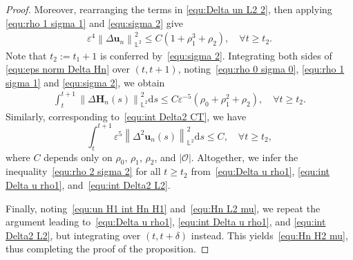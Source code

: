 \documentclass[11pt, reqno]{amsart}
\theoremstyle{definition}
\numberwithin{equation}{section}
\newcommand{\bff}{\boldsymbol}
\newcommand{\bb}{\mathbb}
\newcommand{\ds}{\mathrm{d}s}
\newcommand{\norm}[2]{\left\|{#1}\right\|_{#2}}
\newcommand{\inpro}[2]{\left\langle#1,#2\right\rangle}
\begin{document}
\begin{proof}

	
	Moreover, rearranging the terms in \eqref{equ:Delta un L2 2}, then applying \eqref{equ:rho 1 sigma 1} and \eqref{equ:sigma 2} give
	\begin{align}\label{equ:Delta u rho1}
		\varepsilon^4 \norm{\Delta \bff{u}_n}{\bb{L}^2}^2 
		\leq
		C(1+\rho_1^3+\rho_2),
		\quad
		\forall t\geq t_2.
	\end{align}
	Note that $t_2:=t_1+1$ is conferred by~\eqref{equ:sigma 2}. Integrating both sides of \eqref{equ:eps norm Delta Hn} over $(t,t+1)$, noting~\eqref{equ:rho 0 sigma 0}, \eqref{equ:rho 1 sigma 1} and \eqref{equ:sigma 2}, we obtain
	\begin{align}\label{equ:int Delta u rho1}
		\int_t^{t+1}  \norm{\Delta \bff{H}_n(s)}{\bb{L}^2}^2 \ds
		\leq
		C\varepsilon^{-5}(\rho_0 +\rho_1^2 +\rho_2), 
		\quad 
		\forall t\geq t_2.
	\end{align}
	Similarly, corresponding to~\eqref{equ:int Delta2 CT}, we have
	\begin{equation}\label{equ:int Delta2 L2}
		\int_t^{t+1} \varepsilon^5 \norm{\Delta^2 \bff{u}_n(s)}{\bb{L}^2}^2 \ds \leq C,
		\quad 
		\forall t\geq t_2,
	\end{equation}
	where $C$ depends only on $\rho_0$, $\rho_1$, $\rho_2$, and $|\mathscr{O}|$.
	Altogether, we infer the inequality~\eqref{equ:rho 2 sigma 2} for all $t\geq t_2$ from~\eqref{equ:Delta u rho1}, \eqref{equ:int Delta u rho1}, and~\eqref{equ:int Delta2 L2}. 
	
	Finally, noting~\eqref{equ:un H1 int Hn H1} and~\eqref{equ:Hn L2 mu}, we repeat the argument leading to~\eqref{equ:Delta u rho1}, \eqref{equ:int Delta u rho1}, and \eqref{equ:int Delta2 L2}, but integrating over $(t,t+\delta)$ instead. This yields~\eqref{equ:Hn H2 mu}, thus completing the proof of the proposition.
\end{proof}
\end{document}
